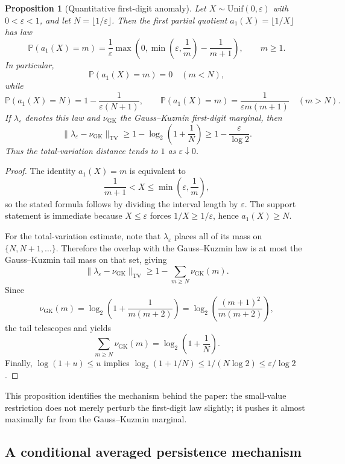 \documentclass[11pt]{article}
\newtheorem{proposition}[definition]{Proposition}
\begin{document}
\begin{proposition}[Quantitative first-digit anomaly]\label{prop:firstdigit}
Let $X\sim \mathrm{Unif}(0,\varepsilon)$ with $0<\varepsilon<1$, and let $N=\lfloor 1/\varepsilon\rfloor$. Then the first partial quotient $a_1(X)=\lfloor 1/X\rfloor$ has law
\[
\mathbb{P}(a_1(X)=m)=\frac{1}{\varepsilon}\max\!\left(0,\min\!\left(\varepsilon,\frac1m\right)-\frac{1}{m+1}\right),
\qquad m\ge1.
\]
In particular,
\[
\mathbb{P}(a_1(X)=m)=0 \quad (m<N),
\]
while
\[
\mathbb{P}(a_1(X)=N)=1-\frac{1}{\varepsilon(N+1)},
\qquad
\mathbb{P}(a_1(X)=m)=\frac{1}{\varepsilon m(m+1)} \quad (m>N).
\]
If $\lambda_{\varepsilon}$ denotes this law and $\nu_{\mathrm{GK}}$ the Gauss--Kuzmin first-digit marginal, then
\[
\|\lambda_{\varepsilon}-\nu_{\mathrm{GK}}\|_{\mathrm{TV}}
\ge
1-\log_2\!\left(1+\frac1N\right)
\ge
1-\frac{\varepsilon}{\log 2}.
\]
Thus the total-variation distance tends to $1$ as $\varepsilon\downarrow 0$.
\end{proposition}

\begin{proof}
The identity $a_1(X)=m$ is equivalent to
\[
\frac{1}{m+1}<X\le \min\!\left(\varepsilon,\frac1m\right),
\]
so the stated formula follows by dividing the interval length by $\varepsilon$. The support statement is immediate because $X\le \varepsilon$ forces $1/X\ge 1/\varepsilon$, hence $a_1(X)\ge N$.

For the total-variation estimate, note that $\lambda_{\varepsilon}$ places all of its mass on $\{N,N+1,\dots\}$. Therefore the overlap with the Gauss--Kuzmin law is at most the Gauss--Kuzmin tail mass on that set, giving
\[
\|\lambda_{\varepsilon}-\nu_{\mathrm{GK}}\|_{\mathrm{TV}} \ge 1-\sum_{m\ge N}\nu_{\mathrm{GK}}(m).
\]
Since
\[
\nu_{\mathrm{GK}}(m)=\log_2\!\left(1+\frac{1}{m(m+2)}\right)
= \log_2\!\left(\frac{(m+1)^2}{m(m+2)}\right),
\]
the tail telescopes and yields
\[
\sum_{m\ge N}\nu_{\mathrm{GK}}(m)=\log_2\!\left(1+\frac1N\right).
\]
Finally, $\log(1+u)\le u$ implies $\log_2(1+1/N)\le 1/(N\log 2)\le \varepsilon/\log 2$.
\end{proof}

This proposition identifies the mechanism behind the paper: the small-value restriction does not merely perturb the first-digit law slightly; it pushes it almost maximally far from the Gauss--Kuzmin marginal.

\subsection{A conditional averaged persistence mechanism}
\end{document}

